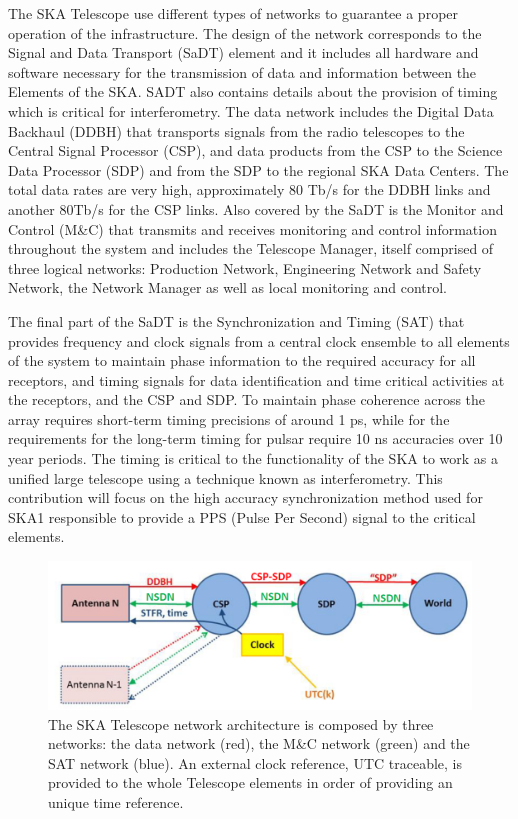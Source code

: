 \documentclass[review]{elsarticle}
\begin{document}
The SKA Telescope use different types of networks to guarantee a proper operation of the infrastructure. The design of the network corresponds to the Signal and Data Transport (SaDT) element \cite{ska:sadt_website} and it includes all hardware and software necessary for the transmission of data and information between the Elements of the SKA. SADT also contains details about the provision of timing which is critical for interferometry.
The data network includes the Digital Data Backhaul (DDBH) that transports signals from the radio telescopes to the Central Signal Processor (CSP), and data products from the CSP to the Science Data Processor (SDP) and from the SDP to the regional SKA Data Centers. The total data rates are very high, approximately 80 Tb/s for the DDBH links and another 80Tb/s for the CSP links. 
Also covered by the SaDT is the Monitor and Control (M\&C) that transmits and receives monitoring and control information throughout the system and includes the Telescope Manager, itself comprised of three logical networks: Production Network, Engineering Network and Safety Network, the Network Manager as well as local monitoring and control.

The final part of the SaDT is the Synchronization and Timing (SAT) that provides frequency and clock signals from a central clock ensemble to all elements of the system to maintain phase information to the required accuracy for all receptors, and timing signals for data identification and time critical activities at the receptors, and the CSP and SDP. To maintain phase coherence across the array requires short-term timing precisions of around 1 ps, while for the requirements for the long-term timing for pulsar require 10 ns accuracies over 10 year periods. The timing is critical to the functionality of the SKA to work as a unified large telescope using a technique known as interferometry. This contribution will focus on the high accuracy synchronization method used for SKA1 responsible to provide a PPS (Pulse Per Second) signal to the critical elements. 

\begin{figure}[h]
	\includegraphics[scale=0.4]{img/ska_network_arch}
	\caption{The SKA Telescope network architecture is composed by three networks: the data network (red), the M\&C network (green) and the SAT network (blue). An external clock reference, UTC traceable, is provided to the whole Telescope elements in order of providing an unique time reference.}
	\label{fig:ska_net_arch1}
\end{figure}
\end{document}

